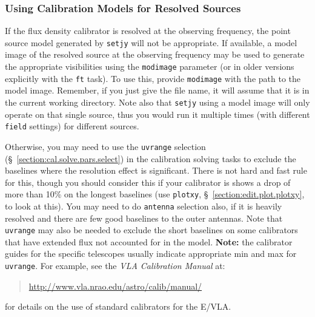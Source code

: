 \subsubsection{Using Calibration Models for Resolved Sources}
\label{section:cal.prior.models.resolved}

If the flux density calibrator is resolved at the observing frequency,
the point source model generated by {\tt setjy} will not be
appropriate.  If available, a model image of the resolved source at
the observing frequency may be used to generate the appropriate
visibilities using the {\tt modimage} parameter (or in older
versions explicitly with the {\tt ft} task).  To use this, provide
{\tt modimage} with the path to the model image.  Remember, if you
just give the file name, it will assume that it is in the
current working directory.  Note also that {\tt setjy} using a 
model image will only operate on that single source, thus you
would run it multiple times (with different {\tt field} settings)
for different sources.

Otherwise, you may
need to use the {\tt uvrange} selection
(\S~\ref{section:cal.solve.pars.select}) 
in the calibration solving tasks to exclude the baselines
where the resolution effect is significant.  There is not hard
and fast rule for this, though you should consider this if your
calibrator is shows a drop of more than 10\% on the longest baselines
(use {\tt plotxy}, \S~\ref{section:edit.plot.plotxy}, to look at this).
You may need to do {\tt antenna} selection also, if it is heavily
resolved and there are few good baselines to the outer antennas.
Note that {\tt uvrange} may also be needed to exclude the short
baselines on some calibrators that have extended flux not accounted
for in the model.
{\bf Note:} the calibrator guides for the specific telescopes usually
indicate appropriate min and max for {\tt uvrange}. For example,
see the {\em VLA Calibration Manual} at:
\begin{quote}
   \url{http://www.vla.nrao.edu/astro/calib/manual/}
\end{quote}
for details on the use of standard calibrators for the E/VLA.

